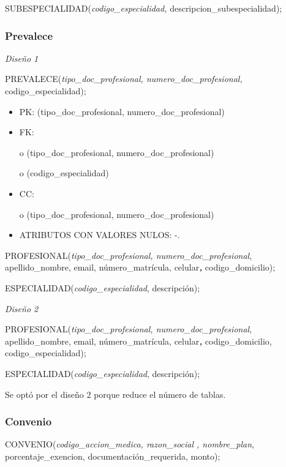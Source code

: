 \documentclass[a4paper,11pt]{article}
\begin{document}
SUBESPECIALIDAD(\emph{codigo\_especialidad, }descripcion\_subespecialidad);\label{HToc293405845}

\subsubsection{\textbf{Prevalece}}

\textit{Diseño 1}

PREVALECE(\emph{tipo\_doc\_profesional, numero\_doc\_profesional}\textit{, }codigo\_especialidad);

\begin{itemize}
\item PK: (tipo\_doc\_profesional, numero\_doc\_profesional)

\item FK: 

o (tipo\_doc\_profesional, numero\_doc\_profesional)

o (codigo\_especialidad)

\item CC:

o (tipo\_doc\_profesional, numero\_doc\_profesional)

\item ATRIBUTOS CON VALORES NULOS:  -.
\end{itemize}

PROFESIONAL(\emph{tipo\_doc\_profesional, numero\_doc\_profesional}, apellido\_nombre, 
email, número\_matrícula, celular\textit{\textbf{, }}codigo\_domicilio);

ESPECIALIDAD(\emph{codigo\_especialidad}, descripción);

\textit{Diseño 2}

PROFESIONAL(\emph{tipo\_doc\_profesional, numero\_doc\_profesional}, apellido\_nombre, 
email, número\_matrícula, celular\textit{\textbf{, }}codigo\_domicilio,\textit{\textbf{ 
}}codigo\_especialidad);

ESPECIALIDAD(\emph{codigo\_especialidad}, descripción);

Se optó por el diseño 2 porque reduce el número de tablas.\label{HToc293405846}

\subsubsection{\textbf{Convenio}}

CONVENIO(\emph{codigo\_accion\_medica, razon\_social , nombre\_plan}, porcentaje\_exencion, 
documentación\_requerida, monto);
\end{document}
